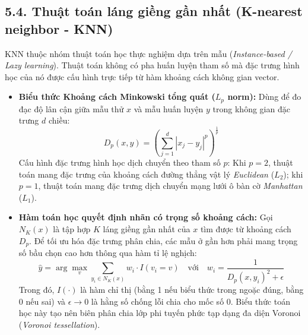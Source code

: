 \documentclass[../main.tex]{subfiles}
\begin{document}
\subsection{5.4. Thuật toán láng giềng gần nhất (K-nearest neighbor - KNN)}
KNN thuộc nhóm thuật toán học thực nghiệm dựa trên mẫu (\textit{Instance-based / Lazy learning}). Thuật toán không có pha huấn luyện tham số mà đặc trưng hình học của nó được cấu hình trực tiếp từ hàm khoảng cách không gian vector.
\begin{itemize}
    \item \textbf{Biểu thức Khoảng cách Minkowski tổng quát ($L_p$ norm):} Dùng để đo đạc độ lân cận giữa mẫu thử $x$ và mẫu huấn luyện $y$ trong không gian đặc trưng $d$ chiều:
    \begin{equation}
        D_p(x, y) = \left( \sum_{j=1}^{d} |x_j - y_j|^p \right)^{\frac{1}{p}}
    \end{equation}
    Cấu hình đặc trưng hình học dịch chuyển theo tham số $p$: Khi $p=2$, thuật toán mang đặc trưng của khoảng cách đường thẳng vật lý \textit{Euclidean} ($L_2$); khi $p=1$, thuật toán mang đặc trưng dịch chuyển mạng lưới ô bàn cờ \textit{Manhattan} ($L_1$).
    \item \textbf{Hàm toán học quyết định nhãn có trọng số khoảng cách:} Gọi $N_K(x)$ là tập hợp $K$ láng giềng gần nhất của $x$ tìm được từ khoảng cách $D_p$. Để tối ưu hóa đặc trưng phân chia, các mẫu ở gần hơn phải mang trọng số bầu chọn cao hơn thông qua hàm tỉ lệ nghịch:
    \begin{equation}
        \hat{y} = \arg\max_{v} \sum_{y_i \in N_K(x)} w_i \cdot I(v_i = v) \quad \text{với} \quad w_i = \frac{1}{D_p(x, y_i)^2 + \epsilon}
    \end{equation}
    Trong đó, $I(\cdot)$ là hàm chỉ thị (bằng 1 nếu biểu thức trong ngoặc đúng, bằng 0 nếu sai) và $\epsilon \rightarrow 0$ là hằng số chống lỗi chia cho mốc số 0. Biểu thức toán học này tạo nên biên phân chia lớp phi tuyến phức tạp dạng đa diện Voronoi (\textit{Voronoi tessellation}).
\end{itemize}
\end{document}
